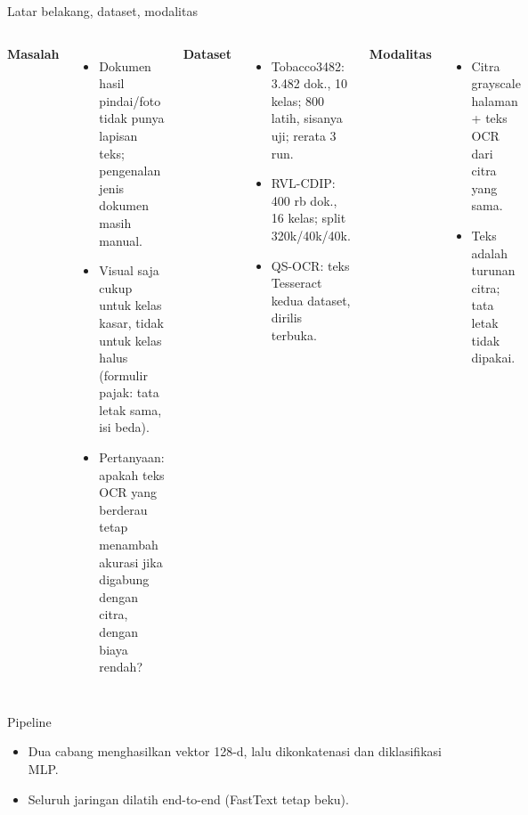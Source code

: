 \documentclass[aspectratio=169,10pt]{beamer}
\newcommand\kecil{\fontsize{8}{9.5}\selectfont}
\begin{document}
\begin{frame}{Latar belakang, dataset, modalitas}
  \begin{columns}[T]
    \textbf{Masalah}
    \begin{itemize}\kecil
      \item Dokumen hasil pindai/foto tidak punya lapisan teks; pengenalan jenis dokumen masih manual.
      \item Visual saja cukup untuk kelas kasar, tidak untuk kelas halus (formulir pajak: tata letak sama, isi beda).
      \item Pertanyaan: apakah teks OCR yang berderau tetap menambah akurasi jika digabung dengan citra, dengan biaya rendah?
    \end{itemize}
    \textbf{Dataset}
    \begin{itemize}\kecil
      \item Tobacco3482: 3.482 dok., 10 kelas; 800 latih, sisanya uji; rerata 3 run.
      \item RVL-CDIP: 400 rb dok., 16 kelas; split 320k/40k/40k.
      \item QS-OCR: teks Tesseract kedua dataset, dirilis terbuka.
    \end{itemize}
    \textbf{Modalitas}
    \begin{itemize}\kecil
      \item Citra grayscale halaman + teks OCR dari citra yang sama.
      \item Teks adalah turunan citra; tata letak tidak dipakai.
    \end{itemize}
  \end{columns}
\end{frame}

\begin{frame}{Pipeline}
  
  \vspace{6pt}
  \begin{itemize}\kecil
    \item Dua cabang menghasilkan vektor 128-d, lalu dikonkatenasi dan diklasifikasi MLP.
    \item Seluruh jaringan dilatih end-to-end (FastText tetap beku).
  \end{itemize}
\end{frame}
\end{document}
